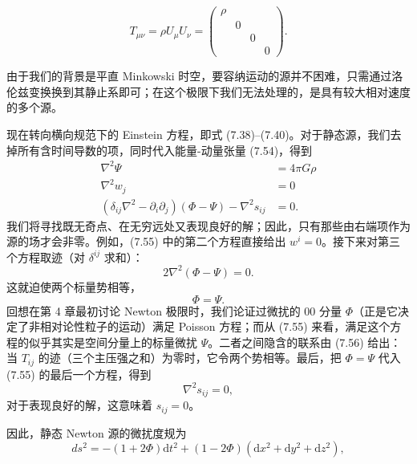 \begin{equation*}
T_{\mu\nu} = \rho U_\mu U_\nu =
\begin{pmatrix}
\rho & & & \\
& 0 & & \\
& & 0 & \\
& & & 0
\end{pmatrix}.
\tag{7.54}
\end{equation*}


由于我们的背景是平直 Minkowski 时空，要容纳运动的源并不困难，只需通过洛伦兹变换换到其静止系即可；在这个极限下我们无法处理的，是具有较大相对速度的多个源。

现在转向横向规范下的 Einstein 方程，即式 (7.38)--(7.40)。对于静态源，我们去掉所有含时间导数的项，同时代入能量-动量张量 (7.54)，得到
\begin{align*}
\nabla^2\Psi &= 4\pi G\rho \\
\nabla^2 w_j &= 0 \\
(\delta_{ij}\nabla^2 - \partial_i\partial_j)(\Phi - \Psi) - \nabla^2 s_{ij} &= 0.
\tag{7.55}
\end{align*}
我们将寻找既无奇点、在无穷远处又表现良好的解；因此，只有那些由右端项作为源的场才会非零。例如，(7.55) 中的第二个方程直接给出 $w^i = 0$。接下来对第三个方程取迹（对 $\delta^{ij}$ 求和）：
\begin{equation*}
2\nabla^2(\Phi - \Psi) = 0.
\tag{7.56}
\end{equation*}
这就迫使两个标量势相等，
\begin{equation*}
\Phi = \Psi.
\tag{7.57}
\end{equation*}
回想在第 4 章最初讨论 Newton 极限时，我们论证过微扰的 00 分量 $\Phi$（正是它决定了非相对论性粒子的运动）满足 Poisson 方程；而从 (7.55) 来看，满足这个方程的似乎其实是空间分量上的标量微扰 $\Psi$。二者之间隐含的联系由 (7.56) 给出：当 $T_{ij}$ 的迹（三个主压强之和）为零时，它令两个势相等。最后，把 $\Phi = \Psi$ 代入 (7.55) 的最后一个方程，得到
\begin{equation*}
\nabla^2 s_{ij} = 0,
\tag{7.58}
\end{equation*}
对于表现良好的解，这意味着 $s_{ij} = 0$。

因此，静态 Newton 源的微扰度规为
\begin{equation*}
\boxed{\,ds^2 = -(1+2\Phi)\mathrm{d}t^2 + (1-2\Phi)(\mathrm{d}x^2 + \mathrm{d}y^2 + \mathrm{d}z^2),\,}
\tag{7.59}
\end{equation*}

